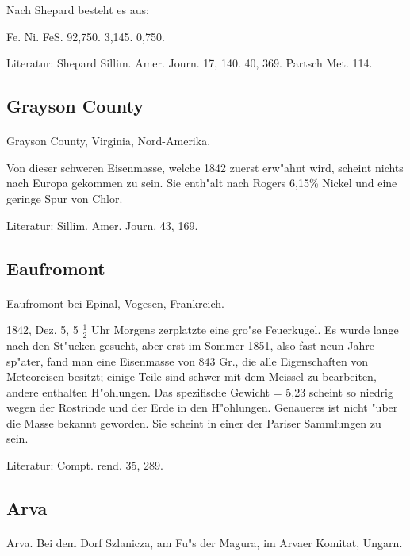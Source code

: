 \documentclass[a4paper, 11pt, oneside]{article}
\begin{document}
Nach Shepard besteht es aus:

Fe. Ni. FeS.  
92,750. 3,145. 0,750.

Literatur: Shepard Sillim. Amer. Journ. 17, 140. 40, 369. Partsch Met. 114.

\subsection{Grayson County}
\normalsize
\paragraph{}
Grayson County, Virginia, Nord-Amerika.

Von dieser schweren Eisenmasse, welche 1842 zuerst erw"ahnt wird, scheint nichts nach Europa gekommen zu sein. Sie enth"alt nach Rogers 6,15\% Nickel und eine geringe Spur von Chlor.

Literatur: Sillim. Amer. Journ. 43, 169.

\subsection{Eaufromont}
\normalsize
\paragraph{}
Eaufromont bei Epinal, Vogesen, Frankreich.

1842, Dez. 5, 5 $\frac{1}{2}$ Uhr Morgens zerplatzte eine gro"se Feuerkugel. Es wurde lange nach den St"ucken gesucht, aber erst im Sommer 1851, also fast neun Jahre sp"ater, fand man eine Eisenmasse von 843 Gr., die alle Eigenschaften von Meteoreisen besitzt; einige Teile sind schwer mit dem Meissel zu bearbeiten, andere enthalten H"ohlungen. Das spezifische Gewicht = 5,23 scheint so niedrig wegen der Rostrinde und der Erde in den H"ohlungen. Genaueres ist nicht "uber die Masse bekannt geworden. Sie scheint in einer der Pariser Sammlungen zu sein.

Literatur: Compt. rend. 35, 289.

\subsection{Arva}
\normalsize
\paragraph{}
Arva. Bei dem Dorf Szlanicza, am Fu"s der Magura, im Arvaer Komitat, Ungarn.
\end{document}
